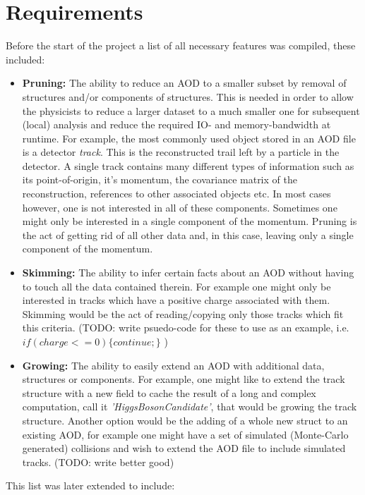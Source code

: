 \documentclass{report}
\begin{document}
\section{Requirements}
Before the start of the project a list of all necessary features was compiled, these included:
\begin{itemize}
  \item {\bf Pruning:} The ability to reduce an AOD to a smaller subset by removal of structures and/or components of structures. This is needed in order to allow
  the physicists to reduce a larger dataset to a much smaller one for subsequent (local) analysis and reduce the required IO- and memory-bandwidth at runtime. For example,
  the most commonly used object stored in an AOD file is a detector {\em track}. This is the reconstructed trail left by a particle in the detector. A single track contains
  many different types of information such as its point-of-origin, it's momentum, the covariance matrix of the reconstruction, references to other associated objects etc.
  In most cases however, one is not interested in all of these components. Sometimes one might only be interested in a single component of the momentum.
  Pruning is the act of getting rid of all other data and, in this case, leaving only a single component of the momentum.
  \item {\bf Skimming:} The ability to infer certain facts about an AOD without having to touch all the data contained therein.
   For example one might only be interested in tracks which have a positive charge associated with them. Skimming would be the act of reading/copying only those
  tracks which fit this criteria.
  (TODO: write psuedo-code for these to use as an example, i.e. $if(charge <= 0)\{ continue; \}$ )
  \item {\bf Growing:} The ability to easily extend an AOD with additional data, structures or components. For example, one might like to extend the track structure with a
  new field to cache the result of a long and complex computation, call it {\em 'HiggsBosonCandidate'}, that would be growing the track structure. Another option would be the
  adding of a whole new struct to an existing AOD, for example one might have a set of simulated (Monte-Carlo generated) collisions and wish to extend the AOD file to include
  simulated tracks. (TODO: write better good)

\end{itemize}
This list was later extended to include:
\end{document}
